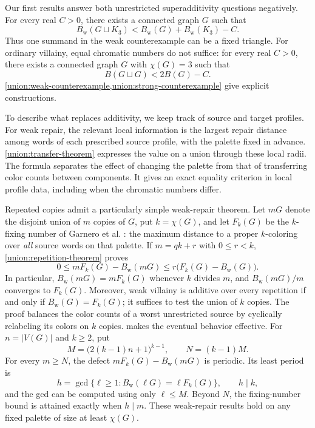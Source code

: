 \documentclass[11pt,reqno]{amsart}
\numberwithin{equation}{section}
\theoremstyle{definition}
\theoremstyle{remark}
\begin{document}
Our first results answer both unrestricted superadditivity questions
negatively. For every real $C>0$,
there exists a connected graph $G$ such that
\[
 B_{\mathrm w}(G\sqcup K_3)
 <B_{\mathrm w}(G)+B_{\mathrm w}(K_3)-C.
\]
Thus one summand in the weak counterexample can be a fixed triangle.
For ordinary villainy, equal chromatic numbers do not suffice: for
every real $C>0$, there exists a connected graph $G$ with $\chi(G)=3$
such that
\[
 B(G\sqcup G)<2B(G)-C.
\]
\cref{union:weak-counterexample,union:strong-counterexample} give explicit constructions.

To describe what replaces additivity, we keep track of source and
target profiles. For weak repair, the relevant local information
is the largest repair distance among words of each prescribed source
profile, with the palette fixed in advance.
\cref{union:transfer-theorem}
expresses the value on a union through these local radii. The formula
separates the effect of changing the palette from that of transferring
color counts between components. It gives an exact equality criterion
in local profile data, including when the chromatic numbers differ.

Repeated copies admit a particularly simple weak-repair theorem. Let
$mG$ denote the disjoint union of $m$ copies of $G$, put $k=\chi(G)$,
and let $F_k(G)$ be the $k$-fixing number of Garnero et al.
\cite{garnero2018}: the maximum distance to a proper $k$-coloring over
\emph{all} source words on that palette. If $m=qk+r$ with $0\le r<k$,
\cref{union:repetition-theorem} proves
\[
 0\le mF_k(G)-B_{\mathrm w}(mG)
 \le r\bigl(F_k(G)-B_{\mathrm w}(G)\bigr).
\]
In particular, $B_{\mathrm w}(mG)=mF_k(G)$ whenever $k$ divides $m$,
and $B_{\mathrm w}(mG)/m$ converges to $F_k(G)$. Moreover, weak
villainy is additive over every repetition if and only if
$B_{\mathrm w}(G)=F_k(G)$; it suffices to test the union of $k$ copies.
The proof balances the color counts of a worst unrestricted source
by cyclically relabeling its colors on $k$ copies.
 makes the eventual behavior
effective. For $n=|V(G)|$ and $k\ge2$, put
\[
 M=\bigl(2(k-1)n+1\bigr)^{k-1},\qquad N=(k-1)M.
\]
For every $m\ge N$, the defect $mF_k(G)-B_{\mathrm w}(mG)$ is
periodic. Its least period is
\[
 h=\gcd\{\ell\ge1:B_{\mathrm w}(\ell G)=\ell F_k(G)\},
 \qquad h\mid k,
\]
and the gcd can be computed using only $\ell\le M$. Beyond $N$,
the fixing-number bound is attained exactly when $h\mid m$.
These weak-repair results hold on any fixed palette of size at least
$\chi(G)$.
\end{document}
